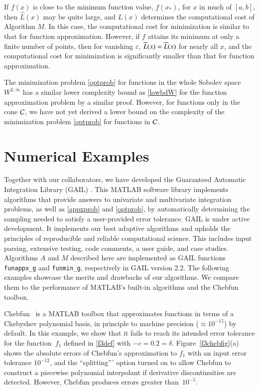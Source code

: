 \documentclass[review]{elsarticle}
\theoremstyle{definition}
\renewcommand{\cw}{W}
\newcommand{\chL}{\widehat{L}}
\newtheorem{exmp}{Example}
\newcommand{\funappxg}{\texttt{funappx\_g}\xspace}
\newcommand{\funming}{\texttt{funmin\_g}\xspace}
\begin{document}
If $f(x)$ is close to the minimum function value, $f(x_*)$, for $x$ in much of
$[a,b]$, then $\chL(x)$ may be quite large, and $L(x)$  determines the
computational cost of Algorithm $M$. In this case, the computational cost for
minimization is similar to that for function approximation. However, if $f$ attains its
minimum at only a finite number of points, then for vanishing $\varepsilon$,
$\widetilde{L}(x) = \widehat{L}(x)$ for nearly all $x$, and the computational cost for minimization
is significantly smaller than that for function approximation.


The minimization problem \eqref{optprob} for functions in the whole Sobolev
space $\cw^{2,\infty}$ has a similar lower complexity bound as \eqref{lowbdW}
for the function approximation problem by a similar proof. However, for
functions only in the cone $\mathcal{C}$, we have not yet derived a lower bound on the
complexity of the minimization problem \eqref{optprob} for functions in $\mathcal{C}$.

\section{Numerical Examples} \label{sec:examples}

Together with our collaborators, we have developed the Guaranteed Automatic
Integration Library (GAIL) \cite{ChoEtal15a}. This MATLAB software library
implements algorithms that provide answers to univariate and multivariate
integration problems, as well as \eqref{appxprob} and \eqref{optprob}, by
automatically determining the sampling needed to satisfy a user-provided error
tolerance. GAIL is under active development. It implements our best adaptive
algorithms and upholds the principles of reproducible and reliable computational
science. This includes input parsing, extensive testing, code comments, a user
guide, and case studies. Algorithms $A$ and $M$ described here are implemented
as GAIL functions \funappxg{} and \funming, respectively in GAIL version 2.2. The following examples
showcase the merits and drawbacks of our algorithms. We compare them to the
performance of MATLAB's built-in algorithms and the Chebfun toolbox.

Chebfun~\cite{TrefEtal16a} is a MATLAB toolbox that approximates functions in
terms of a Chebyshev polynomial basis, in principle to machine precision
($\approx 10^{-15}$) by default. In this example, we show that it fails to reach
its intended error tolerance for the function~$f_1$ defined in \eqref{f3def}
with $-c = 0.2 = \delta$.
Figure~\ref{f3chebfig}(a) shows the absolute errors of Chebfun's approximation to
$f_1$  with an input error tolerance $10^{-12}$, and the ``splitting''' option  turned on to allow
Chebfun to construct a piecewise polynomial interpolant if derivative
discontinuities are detected.  However, Chebfun produces errors greater
than~$10^{-5}$.
\end{document}
